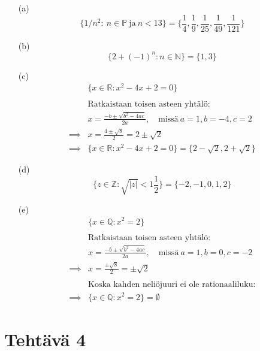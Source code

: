 \documentclass{article}
\begin{document}
\begin{enumerate}
	
	\item[(a)]
	\[
	\{1/n^{2}: \ n \in \mathbb{P} \ \text{ja} \  n < 13 \} = \{ \frac{1}{4}, \frac{1}{9}, \frac{1}{25}, \frac{1}{49}, \frac{1}{121} \}
	\]

	\item[(b)]
	\[
	\{ 2+ (-1)^{n}: n \in \mathbb{N}\} = \{ 1, 3 \}
	\]

	\item[(c)]
	\[
	\begin{aligned}
	&\{x \in \mathbb{R}: x^{2} - 4x  + 2 = 0\} \\
	\\
	&\text{Ratkaistaan toisen asteen yhtälö:} \\
	&x = \frac{-b \pm\sqrt{b^2 - 4ac}}{2a}, \quad \text{missä} \ a = 1, b = -4, c = 2 \\
	\implies &x = \frac{4 \pm \sqrt{8}}{2} = 2 \pm \sqrt{2} \\
	\implies &\{x \in \mathbb{R}: x^{2} - 4x + 2 = 0\} = \{2 - \sqrt{2}, 2 + \sqrt{2}\}
	\end{aligned}
	\]

	\item[(d)]
	\[
	\{z \in \mathbb{Z}: \sqrt{\lvert z \rvert} < 1 \frac{1}{2} \} = \{ -2, -1, 0, 1, 2 \}
	\]

	\item[(e)]
	\[
	\begin{aligned}
	&\{x \in \mathbb{Q}: x^{2} = 2\} \\
	\\
	&\text{Ratkaistaan toisen asteen yhtälö:} \\
	&x = \frac{-b \pm\sqrt{b^2 - 4ac}}{2a}, \quad \text{missä} \ a = 1, b = 0, c = -2 \\
	\implies &x = \frac{\pm \sqrt{8}}{2} = \pm \sqrt{2} \\	
	\\ &\text{Koska kahden neliöjuuri ei ole rationaaliluku:} \\
	\implies &\{x \in \mathbb{Q}: x^{2} = 2\} = \emptyset
	\end{aligned}
	\]

\end{enumerate}


\newpage

\section*{Tehtävä 4}
\end{document}
